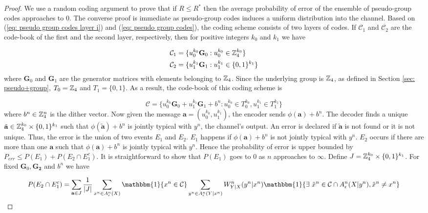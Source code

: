 \documentclass[conference]{IEEEtran}
\theoremstyle{plain}
\theoremstyle{definition}
\theoremstyle{remark}
\begin{document}
\begin{proof}
We use a random coding argument to prove that if $R\leq R^*$ then the average probability of error of the ensemble of pseudo-group codes approaches to $0$. The converse proof is immediate as pseudo-group codes induces a uniform distribution into the channel. Based on (\ref{eq: pseudo group codes layer i}) and (\ref{eq: pseudo group codes}), the coding scheme consists of two layers of codes. If $\mathcal{C}_1$ and $\mathcal{C}_2$ are the code-book of the first and the second layer, respectively, then for positive integers $k_0$ and $k_1$ we have 

\begin{align*}
\mathcal{C}_1&=\{u_0^{k_0}\mathbf{G}_0: u_0^{k_0}\in \mathbb{Z}_4^{k_0}\}\\
\mathcal{C}_2&=\{u_1^{k_1}\mathbf{G}_1: u_1^{k_1}\in \{0,1\}^{k_1}\}
\end{align*}
where $\mathbf{G}_0$ and $\mathbf{G}_1$ are the generator matrices with elements belonging to $\mathbb{Z}_4$.
Since the underlying group is $\mathbb{Z}_4$, as defined in Section \ref{sec: pseudo+group}, $T_0=\mathbb{Z}_4$ and $T_1=\{0,1\}$. As a result, the code-book of this coding scheme is 

\begin{equation*}
\mathcal{C}=\{u_0^{k_0}\mathbf{G}_0+u_1^{k_1}\mathbf{G}_1+b^n: u_0^{k_0}\in T_0^{k_0}, u_1^{k_1}\in T_1^{k_1}\}
\end{equation*}
where $b^n\in \mathbb{Z}_4^n$ is the dither vector. Now given the message $\mathbf{a}=(u_0^{k_0},u_1^{k_1})$, the encoder sends $\phi(\mathbf{a})+b^n$. The decoder finds a unique $\tilde{\mathbf{a}}\in \mathbb{Z}_4^{k_0}\times \{0,1\}^{k_1}$ such that $\phi(\mathbf{\tilde{a}})+b^n$ is jointly typical with $y^n$, the channel's output. An error is declared if $\tilde{\mathbf{a}}$ is not found or it is not unique. Thus, the error is the union of two events $E_1$ and $E_2$. $E_1$ happens if $\phi(\mathbf{a})+b^n$ is not jointly typical with $y^n$. $E_2$ occurs if there are more than one $\mathbf{a}$ such that $\phi(\mathbf{a})+b^n$ is jointly typical with $y^n$. Hence the probability of error is upper bounded by $P_{err}\leq P(E_1)+P(E_2 \cap E_1^c)$. It is straightforward to show that $P(E_1)$ goes to $0$ as $n$ approaches to $\infty$. Define $J=\mathbb{Z}_4^{k_0}\times \{0,1\}^{k_1}$. For fixed $\mathbf{G}_0, \mathbf{G_2}$ and $b^n$ we have

\begin{align*}
P(E_2 \cap E_1^c)=\sum_{\mathbf{a}\in J}\frac{1}{|J|} \sum_{x^n\in A_\epsilon^n(X)} \mathbbm{1}\{ x^n \in \mathcal{C}\} \sum_{y^n\in A_\epsilon^n(Y|x^n)}  W_{Y|X}^n(y^n|x^n) \mathbbm{1}\{ \exists ~ \tilde{x}^n\in \mathcal{C} \cap A_\epsilon^n(X|y^n), \tilde{x}^n\neq x^n \}
\end{align*}


\end{proof}
\end{document}
